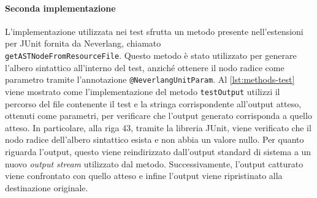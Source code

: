 \documentclass[12pt,a4paper,openright,twoside]{book}
\begin{document}
\paragraph{Seconda implementazione}
L’implementazione utilizzata nei test sfrutta un metodo presente nell'estensioni per JUnit fornita da Neverlang, chiamato\\
\texttt{getASTNodeFromResourceFile}. Questo metodo è stato utilizzato per generare l’albero sintattico all’interno del test, anziché 
ottenere il nodo radice come parametro tramite l’annotazione \texttt{@NeverlangUnitParam}. Al \cref{lst:methods-test} viene mostrato 
come l’implementazione del metodo \texttt{testOutput} utilizzi il percorso del file contenente il test e la stringa corrispondente 
all’output atteso, ottenuti come parametri, per verificare che l’output generato corrisponda a quello atteso. In particolare, alla 
riga 43, tramite la libreria JUnit, viene verificato che il nodo radice dell’albero sintattico esista e non abbia un valore nullo. 
Per quanto riguarda l’output, questo viene reindirizzato dall’output standard di sistema a un nuovo \textit{output stream} utilizzato 
dal metodo. Successivamente, l’output catturato viene confrontato con quello atteso e infine l’output viene ripristinato alla 
destinazione originale.



\backmatter



\end{document}
